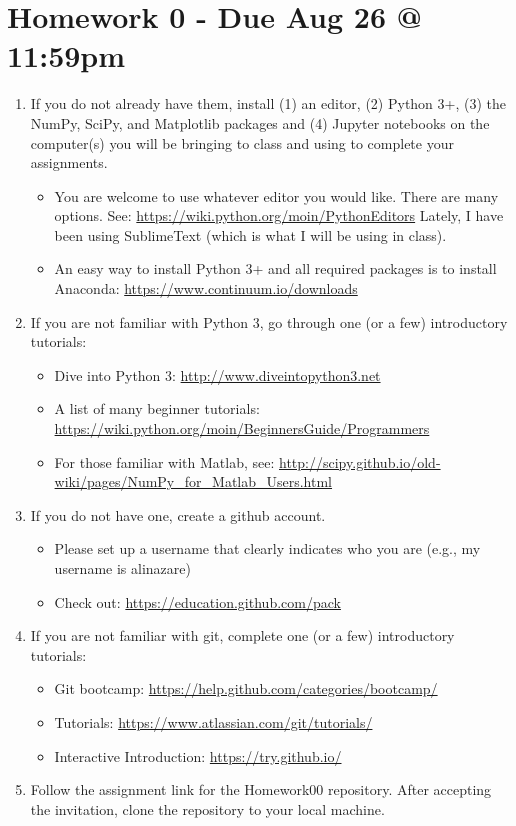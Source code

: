 \documentclass[11pt]{amsart}
\begin{document}
\section{Homework 0 - Due Aug 26 @ 11:59pm}
\begin{enumerate}
\item If you do not already have them, install (1) an editor, (2) Python 3+, (3) the NumPy, SciPy, and Matplotlib packages and (4) Jupyter notebooks on the computer(s) you will be bringing to class and using to complete your assignments.
\begin{itemize}
\item You are welcome to use whatever editor you would like.  There are many options. See: \url{https://wiki.python.org/moin/PythonEditors}  Lately, I have been using SublimeText (which is what I will be using in class).
\item An easy way to install Python 3+ and all required packages is to install Anaconda: \url{https://www.continuum.io/downloads} 

\end{itemize}
\item If you are not familiar with Python 3, go through one (or a few) introductory tutorials:
\begin{itemize}
\item Dive into Python 3: \url{http://www.diveintopython3.net}
\item A list of many beginner tutorials: \url{https://wiki.python.org/moin/BeginnersGuide/Programmers}
\item For those familiar with Matlab, see: \url{http://scipy.github.io/old-wiki/pages/NumPy_for_Matlab_Users.html}
\end{itemize}
\item If you do not have one, create a github account. 
\begin{itemize}
\item Please set up a username that clearly indicates who you are (e.g., my username is alinazare)  
\item Check out: \url{https://education.github.com/pack}
\end{itemize}
\item If you are not familiar with git, complete one (or a few) introductory tutorials:
\begin{itemize}
\item Git bootcamp: \url{https://help.github.com/categories/bootcamp/}
\item Tutorials: \url{https://www.atlassian.com/git/tutorials/}
\item Interactive Introduction: \url{https://try.github.io/}
\end{itemize}
\item Follow the assignment link for the Homework00 repository.  After accepting the invitation, clone the repository to your local machine. 


\end{enumerate}
\end{document}
